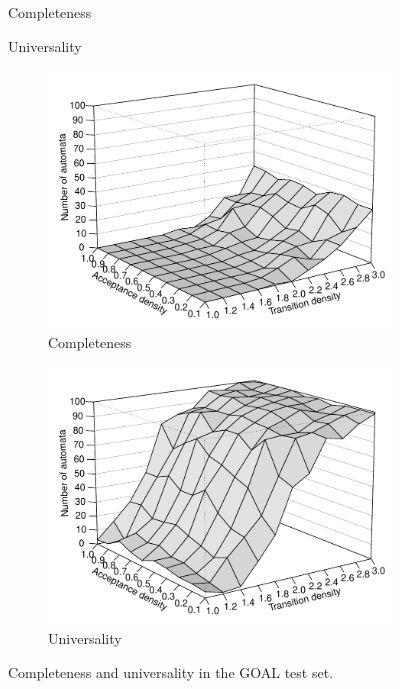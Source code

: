 \begin{figure}
  \centering
  \hfill
  \renewcommand{\tabcolsep}{0.1cm}
  \begin{subtable}[t]{0.45\textwidth}
    \centering
    
    \caption{Completeness}
  \end{subtable}
  \hfill
  \begin{subtable}[t]{0.45\textwidth}
    \centering
    
    \caption{Universality}
  \end{subtable}
  \renewcommand{\tabcolsep}{0.2cm}
  \hfill

  \hfill
  \begin{subfigure}[t]{0.475\textwidth}
    \centering
    \includegraphics[width=\textwidth]{figures/r/completeness/persp.pdf}
    \caption{Completeness}
  \end{subfigure}
  \hfill
  \begin{subfigure}[t]{0.475\textwidth}
    \centering
    \includegraphics[width=\textwidth]{figures/r/universality/persp.pdf}
    \caption{Universality}
  \end{subfigure}
  \hfill
\caption{Completeness and universality in the GOAL test set.}
\label{4_compl_univ}
\end{figure}


